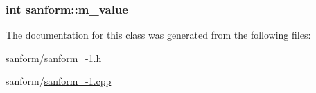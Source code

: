 \subsubsection[{m\+\_\+value}]{\setlength{\rightskip}{0pt plus 5cm}int sanform\+::m\+\_\+value\hspace{0.3cm}{\ttfamily [private]}}\label{classsanform_a16b166bcc39b80caa93a7255d4f10a53}


The documentation for this class was generated from the following files\+:\begin{DoxyCompactItemize}
\item 
sanform/\hyperlink{sanform__1-1_8h}{sanform\+\_-\/1.\+h}\item 
sanform/\hyperlink{sanform__1-1_8cpp}{sanform\+\_-\/1.\+cpp}\end{DoxyCompactItemize}
